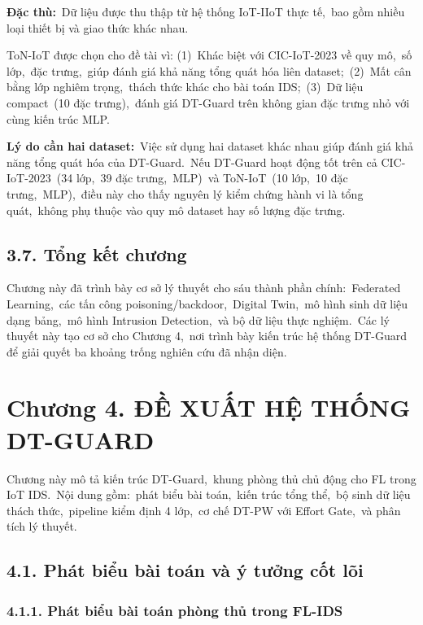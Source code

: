 \textbf{Đặc thù:}~Dữ liệu được thu thập từ hệ thống IoT-IIoT thực tế,~bao gồm nhiều loại thiết bị và giao thức khác nhau.

ToN-IoT được chọn cho đề tài vì: (1)~Khác biệt với CIC-IoT-2023 về quy mô,~số lớp,~đặc trưng,~giúp đánh giá khả năng tổng quát hóa liên dataset;~(2)~Mất cân bằng lớp nghiêm trọng,~thách thức khác cho bài toán IDS;~(3)~Dữ liệu compact~(10 đặc trưng),~đánh giá DT-Guard trên không gian đặc trưng nhỏ với cùng kiến trúc MLP.

\textbf{Lý do cần hai dataset:}~Việc sử dụng hai dataset khác nhau giúp đánh giá khả năng tổng quát hóa của DT-Guard.~Nếu DT-Guard hoạt động tốt trên cả CIC-IoT-2023~(34 lớp,~39 đặc trưng,~MLP)~và ToN-IoT~(10 lớp,~10 đặc trưng,~MLP),~điều này cho thấy nguyên lý kiểm chứng hành vi là tổng quát,~không phụ thuộc vào quy mô dataset hay số lượng đặc trưng.

\subsection{3.7. Tổng kết chương}\label{tux1ed5ng-kux1ebft-chux1b0ux1a1ng-1}

Chương này đã trình bày cơ sở lý thuyết cho sáu thành phần chính:~Federated Learning,~các tấn công poisoning/backdoor,~Digital Twin,~mô hình sinh dữ liệu dạng bảng,~mô hình Intrusion Detection,~và bộ dữ liệu thực nghiệm.~Các lý thuyết này tạo cơ sở cho Chương 4,~nơi trình bày kiến trúc hệ thống DT-Guard để giải quyết ba khoảng trống nghiên cứu đã nhận diện.

\section{Chương 4. ĐỀ XUẤT HỆ THỐNG DT-GUARD}\label{chux1b0ux1a1ng-4.-ux111ux1ec1-xuux1ea5t-hux1ec7-thux1ed1ng-dt-guard}

Chương này mô tả kiến trúc DT-Guard,~khung phòng thủ chủ động cho FL trong IoT IDS.~Nội dung gồm:~phát biểu bài toán,~kiến trúc tổng thể,~bộ sinh dữ liệu thách thức,~pipeline kiểm định 4 lớp,~cơ chế DT-PW với Effort Gate,~và phân tích lý thuyết.

\subsection{4.1. Phát biểu bài toán và ý tưởng cốt lõi}\label{phuxe1t-biux1ec3u-buxe0i-touxe1n-vuxe0-uxfd-tux1b0ux1edfng-cux1ed1t-luxf5i}

\subsubsection{4.1.1. Phát biểu bài toán phòng thủ trong FL-IDS}\label{phuxe1t-biux1ec3u-buxe0i-touxe1n-phuxf2ng-thux1ee7-trong-fl-ids}

